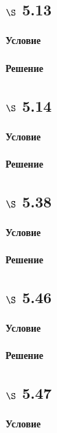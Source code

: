 \documentclass[a4paper,12pt]{article}
\begin{document}
\subsection*{$\S$ 5.13}
\paragraph*{Условие}
\paragraph*{Решение}

\subsection*{$\S$ 5.14}
\paragraph*{Условие}
\paragraph*{Решение}

\subsection*{$\S$ 5.38}
\paragraph*{Условие}
\paragraph*{Решение}

\subsection*{$\S$ 5.46}
\paragraph*{Условие}
\paragraph*{Решение}

\subsection*{$\S$ 5.47}
\paragraph*{Условие}
\end{document}
